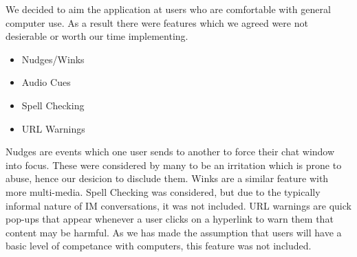 We decided to aim the application at users who are comfortable with general computer use. As a result there were features which we agreed were not desierable or worth our time implementing.

\begin{itemize}

\item{Nudges/Winks}
\item{Audio Cues}
\item{Spell Checking}
\item{URL Warnings}

\end{itemize}

Nudges are events which one user sends to another to force their chat window into focus. These were considered by many to be an irritation which is prone to abuse, hence our desicion to disclude them. Winks are a similar feature with more multi-media. Spell Checking was considered, but due to the typically informal nature of IM conversations, it was not included. URL warnings are quick pop-ups that appear whenever a user clicks on a hyperlink to warn them that content may be harmful. As we has made the assumption that users will have a basic level of competance with computers, this feature was not included.
